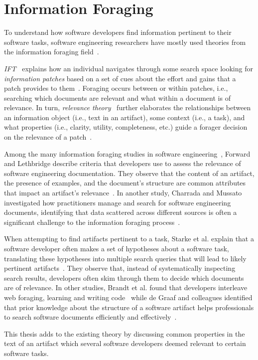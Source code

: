 



\section{Information Foraging}
\label{cp2:foraging}




To understand how software developers find  information pertinent to their software tasks,
software engineering researchers have mostly used theories from the information foraging
field~\cite{Pirolli1999}. 


\textit{\acf{IFT}}~\cite{Pirolli1999} explains how 
an individual navigates through some search space looking for \textit{information patches} based on 
a set of cues about the effort and gains that a patch provides to them~\cite{Pirolli1999}.
Foraging occurs between or within patches, i.e., 
searching which documents are relevant and what within a document is of relevance.
In turn, \textit{relevance theory}~\cite{clark2013relevance, saracevic1975} further elaborates the relationships between an information object (i.e., text in an artifact),
some context (i.e., a task), and what properties (i.e., clarity, utility, completeness, etc.) guide a forager decision 
on the relevance of a patch~\cite{Saracevic2007b, Saracevic2007c}. 



Among the many information foraging studies in software engineering~\cite{Piorkowski2015, Piorkowski2016, chi2007, Ko2006a},
 Forward and Lethbridge describe criteria that developers use to assess the relevance of software engineering documentation. They observe that the content of an artifact, the presence of examples, and the document's structure are common attributes that impact an artifact's relevance~\cite{Forward2002}.
In another study, Charrada and Mussato investigated how 
practitioners manage and search for software engineering documents, 
identifying that data scattered across different sources is 
often a significant challenge to the information foraging process~\cite{BenCharrada2016}.



When attempting to find artifacts pertinent to a task, 
Starke et al. explain that a software developer often makes a set of hypotheses about a software task,
translating these hypotheses into multiple search queries that will lead to  likely pertinent artifacts~\cite{Starke2009}. 
They observe that, instead of systematically inspecting search results,
developers often skim through them to decide which documents are of relevance. 
In other studies, Brandt et al. found that developers interleave web foraging, learning and writing code~\cite{Brandt2009a} while de Graaf and colleagues 
identified that prior knowledge about the structure of a software artifact helps professionals
to search software documents efficiently and effectively~\cite{DeGraaf2014}.


This thesis adds to the existing theory by discussing 
common properties in the text of an artifact which several software developers deemed relevant 
to certain software tasks.  
